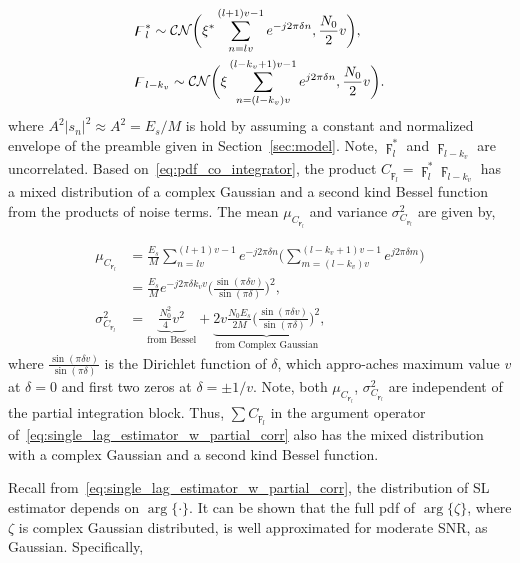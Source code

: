 \begin{equation}
  \label{eq:pdf_co_integrator}
  \begin{aligned}
    &\digamma_l^* \sim \mathcal{CN}\bigg(\xi^*\sum_{n=lv}^{(l+1)v-1}e^{-j2\pi \delta n},\frac{N_0}{2}v\bigg), \\
    &\digamma_{l-k_v} \sim \mathcal{CN}\bigg(\xi\sum_{n=(l-k_v)v}^{(l-k_v+1)v-1}e^{j2\pi \delta n},\frac{N_0}{2}v\bigg).
  \end{aligned}
\end{equation}
where $A^2|s_n|^2 \approx A^2= E_s/M$ is hold by assuming a constant and normalized envelope of the preamble given in Section~\ref{sec:model}.
Note, $\digamma_l^*$ and $\digamma_{l-k_v}$ are uncorrelated. Based on~\eqref{eq:pdf_co_integrator}, 
the product $C_{\digamma_{l}}=\digamma_l^*\digamma_{l-k_v}$ has a mixed distribution of a complex Gaussian and a
second kind Bessel function from the products of noise terms.
The mean $\mu_{C_{\digamma_{l}}}$ and variance $\sigma^2_{C_{\digamma_{l}}}$ are given by, 

\begin{equation}
  \begin{aligned}
  \label{eq:mean_var_product_coherent_int}
  \mu_{C_{\digamma_l}}&=\frac{E_s}{M}\sum_{n=lv}^{(l+1)v-1}e^{-j2\pi \delta n}\bigg(\sum_{m=(l-k_v)v}^{(l-k_v+1)v-1}e^{j2\pi \delta m}\bigg) \\
  &=\frac{E_s}{M}e^{-j2\pi \delta k_vv}\bigg(\frac{\sin(\pi \delta v)}{\sin(\pi \delta)}\bigg)^2, \\
  \sigma^2_{C_{\digamma_l}}&={\underbrace{\frac{N_0^2}{4}v^2}_{\text{from Bessel}}}+{\underbrace{2v\frac{N_0E_s}{2M}\bigg(\frac{\sin(\pi \delta v)}{\sin(\pi \delta)}\bigg)^2}_{\text{from Complex Gaussian}}},
  \end{aligned}
\end{equation}
where $\frac{\sin(\pi \delta v)}{\sin(\pi \delta)}$ is the Dirichlet function of $\delta$, which appro-aches
maximum value $v$ at $\delta{=}0$ and first two zeros at $\delta{=}\pm 1/v$.
Note, both $\mu_{C_{\digamma_l}}$, $\sigma^2_{C_{\digamma_l}}$ are independent of the partial integration block.
Thus, $\sum C_{\digamma_l}$ in the argument operator of~\eqref{eq:single_lag_estimator_w_partial_corr} 
also has the mixed distribution with a complex Gaussian and a second kind Bessel function.

Recall from~\eqref{eq:single_lag_estimator_w_partial_corr}, the distribution of SL estimator depends on $\arg\{\cdot\}$.
It can be shown that the full pdf of $\arg\{\zeta\}$, where $\zeta$ is complex Gaussian distributed, is well approximated for moderate SNR, as Gaussian.
Specifically,

